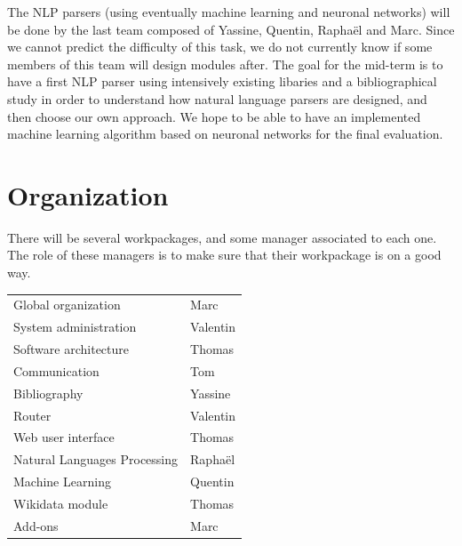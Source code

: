 \documentclass[a4paper,10pt]{article}
\begin{document}
The NLP parsers (using eventually machine learning and neuronal networks) will be done by the
last team composed of Yassine, Quentin, Raphaël and Marc. Since we cannot predict the difficulty
of this task, we do not currently know if some members of this team will design modules after.
The goal for the mid-term is to have a first NLP parser using intensively existing libaries and a
bibliographical study in order to understand how natural language parsers are designed, and then
choose our own approach. We hope to be able to have an implemented machine learning algorithm
based on neuronal networks for the final evaluation.

\section{Organization}

There will be several workpackages, and some manager associated to each one.
The role of these managers is to make sure that their workpackage is on a good way.

\begin{tabular}{ll}
  Global organization & Marc\\
  System administration & Valentin\\
  Software architecture & Thomas\\
  Communication & Tom\\
  Bibliography & Yassine\\
  Router & Valentin\\
  Web user interface & Thomas\\
  Natural Languages Processing & Raphaël\\
  Machine Learning & Quentin\\
  Wikidata module & Thomas\\
  Add-ons & Marc\\
\end{tabular}

\end{document}
